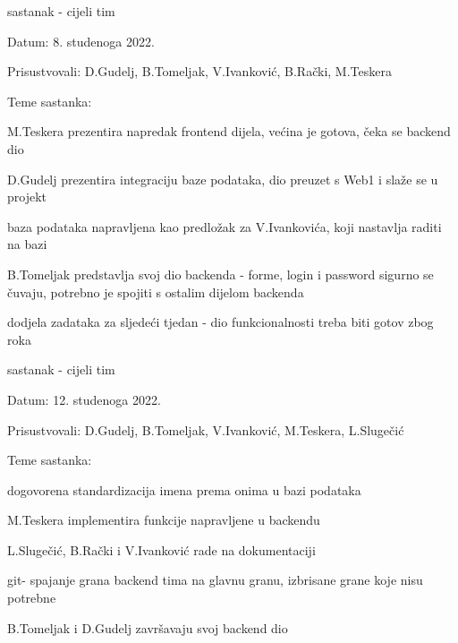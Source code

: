 \begin{packed_enum}
			\item  sastanak - cijeli tim
			\item[] \begin{packed_item}
				\item Datum: 8. studenoga 2022.
				\item Prisustvovali: D.Gudelj, B.Tomeljak, V.Ivanković, B.Rački, M.Teskera
				\item Teme sastanka:
				\begin{packed_item}
					\item M.Teskera prezentira napredak frontend dijela, većina je gotova, čeka se backend dio
					\item D.Gudelj prezentira integraciju baze podataka, dio preuzet s Web1 i slaže se u projekt
					\item baza podataka napravljena kao predložak za V.Ivankovića, koji nastavlja raditi na bazi
					\item B.Tomeljak predstavlja svoj dio backenda - forme, login i password sigurno se čuvaju, potrebno je spojiti s ostalim dijelom backenda
					\item dodjela zadataka za sljedeći tjedan - dio funkcionalnosti treba biti gotov zbog roka
				\end{packed_item}
			\end{packed_item}
			
			
			\item  sastanak - cijeli tim
			\item[] \begin{packed_item}
				\item Datum: 12. studenoga 2022.
				\item Prisustvovali: D.Gudelj, B.Tomeljak, V.Ivanković, M.Teskera, L.Slugečić
				\item Teme sastanka:
				\begin{packed_item}
					\item dogovorena standardizacija imena prema onima u bazi podataka
					\item M.Teskera implementira funkcije napravljene u backendu
					\item L.Slugečić, B.Rački i V.Ivanković rade na dokumentaciji
					\item git- spajanje grana backend tima na glavnu granu, izbrisane grane koje nisu potrebne
					\item B.Tomeljak i D.Gudelj završavaju svoj backend dio
				\end{packed_item}
			\end{packed_item}
			

\end{packed_enum}
